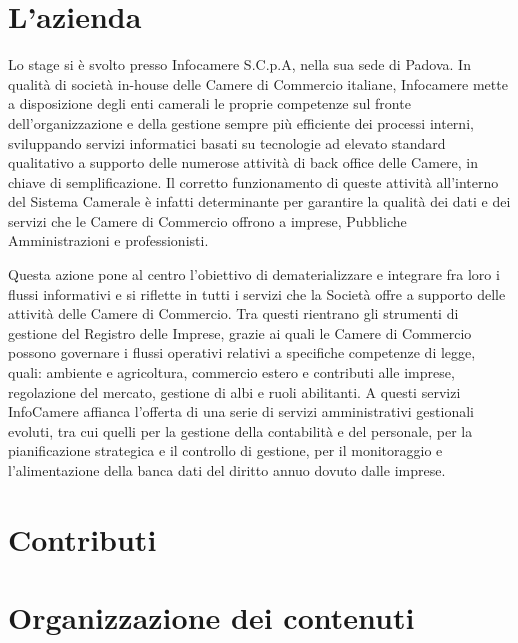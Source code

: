 \section{L'azienda}
	Lo stage si è svolto presso Infocamere S.C.p.A, nella sua sede di Padova.
	In qualità di società in-house delle Camere di Commercio italiane, Infocamere mette a disposizione degli enti camerali le proprie competenze sul fronte dell’organizzazione e della gestione sempre più efficiente dei processi interni, sviluppando servizi informatici basati su tecnologie ad elevato standard qualitativo a supporto delle numerose attività di back office delle Camere, in chiave di semplificazione. Il corretto funzionamento di queste attività all'interno del Sistema Camerale è infatti determinante per garantire la qualità dei dati e dei servizi che le Camere di Commercio offrono a imprese, Pubbliche Amministrazioni e professionisti.
	
	Questa azione pone al centro l’obiettivo di dematerializzare e integrare fra loro i flussi informativi e si riflette in tutti i servizi che la Società offre a supporto delle attività delle Camere di Commercio. Tra questi rientrano gli strumenti di gestione del Registro delle Imprese, grazie ai quali le Camere di Commercio possono governare i flussi operativi relativi a specifiche competenze di legge, quali: ambiente e agricoltura, commercio estero e contributi alle imprese, regolazione del mercato, gestione di albi e ruoli abilitanti. A questi servizi InfoCamere affianca l’offerta di una serie di servizi amministrativi gestionali evoluti, tra cui quelli per la gestione della contabilità e del personale, per la pianificazione strategica e il controllo di gestione, per il monitoraggio e l'alimentazione della banca dati del diritto annuo dovuto dalle imprese.

\section{Contributi}

\section{Organizzazione dei contenuti}